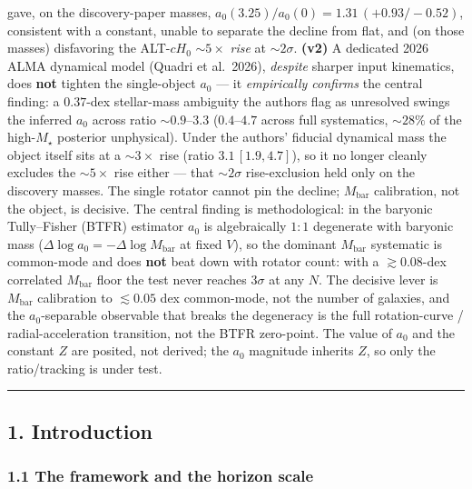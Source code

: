 \documentclass[
]{article}
\begin{document}
gave, on the discovery-paper masses,
\(a_0(3.25)/a_0(0)=1.31\,(+0.93/-0.52)\), consistent with a constant,
unable to separate the decline from flat, and (on those masses)
disfavoring the ALT-\(cH_0\) \(\sim5\times\) \emph{rise} at
\(\sim2\sigma\). \textbf{(v2)} A dedicated 2026 ALMA dynamical model
(Quadri et al.~2026), \emph{despite} sharper input kinematics, does
\textbf{not} tighten the single-object \(a_0\) --- it \emph{empirically
confirms} the central finding: a \(0.37\)-dex stellar-mass ambiguity the
authors flag as unresolved swings the inferred \(a_0\) across ratio
\(\sim0.9\)--\(3.3\) (\(0.4\)--\(4.7\) across full systematics,
\(\sim28\%\) of the high-\(M_\star\) posterior unphysical). Under the
authors' fiducial dynamical mass the object itself sits at a
\(\sim3\times\) rise (ratio \(3.1\,[1.9,4.7]\)), so it no longer cleanly
excludes the \(\sim5\times\) rise either --- that \(\sim2\sigma\)
rise-exclusion held only on the discovery masses. The single rotator
cannot pin the decline; \(M_\mathrm{bar}\) calibration, not the object, is
decisive. The central finding is methodological: in the baryonic
Tully--Fisher (BTFR) estimator \(a_0\) is algebraically \(1{:}1\)
degenerate with baryonic mass
(\(\Delta\log a_0=-\Delta\log M_\mathrm{bar}\) at fixed \(V\)), so the
dominant \(M_\mathrm{bar}\) systematic is common-mode and does \textbf{not}
beat down with rotator count: with a \(\gtrsim0.08\)-dex correlated
\(M_\mathrm{bar}\) floor the test never reaches \(3\sigma\) at any \(N\).
The decisive lever is \(M_\mathrm{bar}\) calibration to \(\lesssim0.05\)
dex common-mode, not the number of galaxies, and the \(a_0\)-separable
observable that breaks the degeneracy is the full rotation-curve /
radial-acceleration transition, not the BTFR zero-point. The value of
\(a_0\) and the constant \(Z\) are posited, not derived; the \(a_0\)
magnitude inherits \(Z\), so only the ratio/tracking is under test.

\begin{center}\rule{0.5\linewidth}{0.5pt}\end{center}

\subsection{1. Introduction}\label{introduction}

\subsubsection{1.1 The framework and the horizon
scale}\label{the-framework-and-the-horizon-scale}
\end{document}
